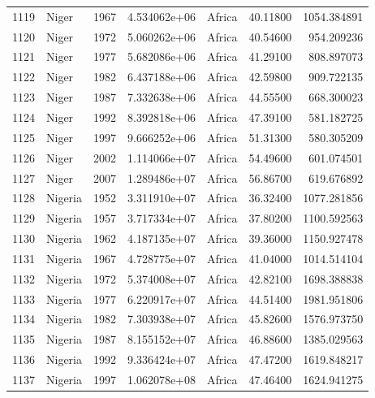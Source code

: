 \documentclass[
  letterpaper,
  DIV=11,
  numbers=noendperiod]{scrreprt}
\begin{document}
\begin{tabular}{llrrlrr}
1119 &                     Niger &  1967 &  4.534062e+06 &    Africa &  40.11800 &    1054.384891 \\
1120 &                     Niger &  1972 &  5.060262e+06 &    Africa &  40.54600 &     954.209236 \\
1121 &                     Niger &  1977 &  5.682086e+06 &    Africa &  41.29100 &     808.897073 \\
1122 &                     Niger &  1982 &  6.437188e+06 &    Africa &  42.59800 &     909.722135 \\
1123 &                     Niger &  1987 &  7.332638e+06 &    Africa &  44.55500 &     668.300023 \\
1124 &                     Niger &  1992 &  8.392818e+06 &    Africa &  47.39100 &     581.182725 \\
1125 &                     Niger &  1997 &  9.666252e+06 &    Africa &  51.31300 &     580.305209 \\
1126 &                     Niger &  2002 &  1.114066e+07 &    Africa &  54.49600 &     601.074501 \\
1127 &                     Niger &  2007 &  1.289486e+07 &    Africa &  56.86700 &     619.676892 \\
1128 &                   Nigeria &  1952 &  3.311910e+07 &    Africa &  36.32400 &    1077.281856 \\
1129 &                   Nigeria &  1957 &  3.717334e+07 &    Africa &  37.80200 &    1100.592563 \\
1130 &                   Nigeria &  1962 &  4.187135e+07 &    Africa &  39.36000 &    1150.927478 \\
1131 &                   Nigeria &  1967 &  4.728775e+07 &    Africa &  41.04000 &    1014.514104 \\
1132 &                   Nigeria &  1972 &  5.374008e+07 &    Africa &  42.82100 &    1698.388838 \\
1133 &                   Nigeria &  1977 &  6.220917e+07 &    Africa &  44.51400 &    1981.951806 \\
1134 &                   Nigeria &  1982 &  7.303938e+07 &    Africa &  45.82600 &    1576.973750 \\
1135 &                   Nigeria &  1987 &  8.155152e+07 &    Africa &  46.88600 &    1385.029563 \\
1136 &                   Nigeria &  1992 &  9.336424e+07 &    Africa &  47.47200 &    1619.848217 \\
1137 &                   Nigeria &  1997 &  1.062078e+08 &    Africa &  47.46400 &    1624.941275 \\

\end{tabular}
\end{document}
